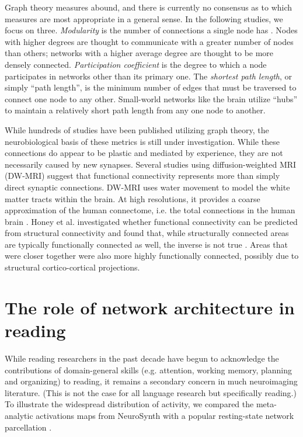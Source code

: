 Graph theory measures abound, and there is currently no consensus as to which measures are most appropriate in a general sense. In the following studies, we focus on three. \textit{Modularity} is the number of connections a single node has \citep{Sporns2013}. Nodes with higher degrees are thought to communicate with a greater number of nodes than others; networks with a higher average degree are thought to be more densely connected. \textit{Participation coefficient} is the degree to which a node participates in networks other than its primary one. The \textit{shortest path length}, or simply ``path length'', is the minimum number of edges that must be traversed to connect one node to any other. Small-world networks like the brain utilize ``hubs'' to maintain a relatively short path length from any one node to another. 

While hundreds of studies have been published utilizing graph theory, the neurobiological basis of these metrics is still under investigation. While these connections do appear to be plastic and mediated by experience, they are not necessarily caused by new synapses. Several studies using diffusion-weighted MRI (DW-MRI) suggest that functional connectivity represents more than simply direct synaptic connections. DW-MRI uses water movement to model the white matter tracts within the brain. At high resolutions, it provides a coarse approximation of the human connectome, i.e. the total connections in the human brain \citep{Sporns2005}. Honey et al. investigated whether functional connectivity can be predicted from structural connectivity and found that, while structurally connected areas are typically functionally connected as well, the inverse is not true \citep{Honey2009}. Areas that were closer together were also more highly functionally connected, possibly due to structural cortico-cortical projections. 


\section{The role of network architecture in reading}
While reading researchers in the past decade have begun to acknowledge the contributions of domain-general skills (e.g. attention, working memory, planning and organizing) to reading, it remains a secondary concern in much neuroimaging literature. (This is not the case for all language research but specifically reading.) To illustrate the widespread distribution of activity, we compared the meta-analytic activations maps from NeuroSynth with a popular resting-state network parcellation \citep{Bailey2018}. 


